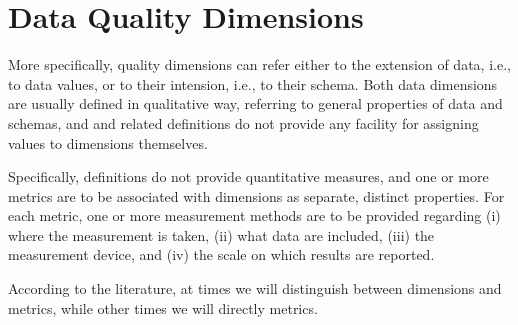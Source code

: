 \chapter{Data Quality Dimensions}

\ifpdf
    \graphicspath{{Chapter2/Figs/Raster/}{Chapter2/Figs/PDF/}{Chapter2/Figs/}}
\else
    \graphicspath{{Chapter2/Figs/Vector/}{Chapter2/Figs/}}
\fi

More specifically, quality dimensions can refer either to the extension of data, i.e., to data values, or to their 
intension, i.e., to their schema. Both data dimensions are usually defined in qualitative way, referring to general properties of data and schemas,
and and related definitions do not provide any facility for assigning values to dimensions themselves. 

Specifically, definitions do not provide quantitative measures, and one or more metrics are to be associated with dimensions as separate, distinct 
properties. For each metric, one or more measurement methods are to be provided regarding (i) where the measurement is taken, (ii) what data are included, 
(iii) the measurement device, and (iv) the scale on which results are reported.

According to the literature, at times we will distinguish between dimensions and metrics, while other times we will directly metrics.

